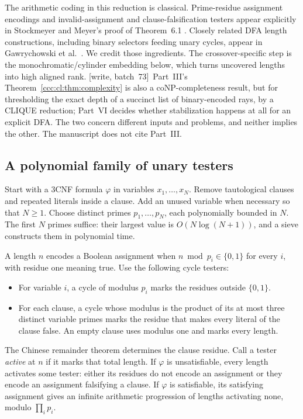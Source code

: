\documentclass[11pt,letterpaper]{article}
\theoremstyle{definition}
\theoremstyle{remark}
\newcommand{\wsevthree}{\textup{[write, batch~73]}}
\begin{document}
The arithmetic coding in this reduction is classical. Prime-residue assignment encodings and invalid-assignment and clause-falsification testers appear explicitly in Stockmeyer and Meyer's proof of Theorem~6.1 \cite{SM}. Closely related DFA length constructions, including binary selectors feeding unary cycles, appear in Gawrychowski et al.\ \cite[Theorems~5--6]{GLRSS}. We credit those ingredients. The crossover-specific step is the monochromatic/cylinder embedding below, which turns uncovered lengths into high aligned rank.
\wsevthree\ Part~III's Theorem~\ref{ccc:cl:thm:complexity} is also a
coNP-completeness result, but for thresholding the exact depth of a succinct
list of binary-encoded rays, by a CLIQUE reduction; Part~VI decides whether
stabilization happens at all for an explicit DFA. The two concern different
inputs and problems, and neither implies the other. The manuscript does not
cite Part~III.

\subsection{A polynomial family of unary testers}

Start with a 3CNF formula $\varphi$ in variables $x_1,\ldots,x_N$. Remove tautological clauses and repeated literals inside a clause. Add an unused variable when necessary so that $N\ge1$. Choose distinct primes $p_1,\ldots,p_N$, each polynomially bounded in $N$. The first $N$ primes suffice: their largest value is $O(N\log(N+1))$, and a sieve constructs them in polynomial time.

A length $n$ encodes a Boolean assignment when $n\bmod p_i\in\{0,1\}$ for every $i$, with residue one meaning true. Use the following cycle testers:
\begin{itemize}
\item For variable $i$, a cycle of modulus $p_i$ marks the residues outside $\{0,1\}$.
\item For each clause, a cycle whose modulus is the product of its at most three distinct variable primes marks the residue that makes every literal of the clause false. An empty clause uses modulus one and marks every length.
\end{itemize}
The Chinese remainder theorem determines the clause residue. Call a tester \emph{active} at $n$ if it marks that total length. If $\varphi$ is unsatisfiable, every length activates some tester: either its residues do not encode an assignment or they encode an assignment falsifying a clause. If $\varphi$ is satisfiable, its satisfying assignment gives an infinite arithmetic progression of lengths activating none, modulo $\prod_i p_i$.
\end{document}
